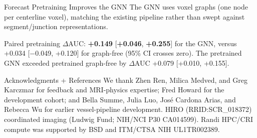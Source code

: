 \documentclass[final]{beamer}
\newlength{\colwidth}
\newenvironment{highlightbox}[1][block alerted body]
  {\begin{beamercolorbox}[colsep*=0ex,sep=1.5ex]{#1}}
  {\end{beamercolorbox}\vskip1ex}
\begin{document}
\begin{frame}[t]
\begin{columns}[t]
\begin{column}{\colwidth}
\begin{alertblock}{Forecast Pretraining Improves the GNN}
    The GNN uses voxel graphs (one node per centerline voxel), matching the
    existing pipeline rather than swept against segment/junction
    representations.

    Paired pretraining $\Delta$AUC: \textbf{+0.149} [\textbf{+0.046},
    \textbf{+0.255}] for the GNN, versus +0.034 [$-$0.049, +0.120] for
    graph-free (95\% CI crosses zero). The pretrained GNN exceeded pretrained
    graph-free by $\Delta$AUC +0.079 [+0.010, +0.155].


  \end{alertblock}


  \begin{block}{Acknowledgments + References}
    We thank Zhen Ren, Milica Medved, and Greg Karczmar for feedback and
    MRI-physics expertise; Fred Howard for the development cohort; and Bella
    Summe, Julia Luo, José Cardona Arias, and Rebecca Wu for earlier
    vessel-pipeline development. HIRO (RRID:SCR\_018372) coordinated imaging
    (Ludwig Fund; NIH/NCI P30 CA014599). Randi HPC/CRI compute was supported by
    BSD and ITM/CTSA NIH UL1TR002389.


\end{block}
\end{column}
\end{columns}
\end{frame}
\end{document}
